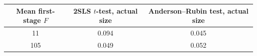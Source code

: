 \begin{tabular}{ccc}\toprule
Mean first-stage $F$ & 2SLS $t$-test, actual size & Anderson--Rubin test, actual size \\ \midrule
11 & 0.094 & 0.045 \\
105 & 0.049 & 0.052 \\
\bottomrule\end{tabular}

